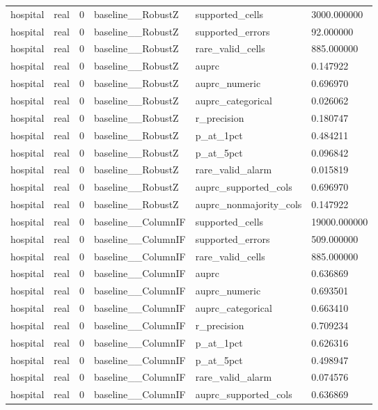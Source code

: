 \begin{tabular}{llllll}
hospital & real & 0 & baseline\_\_RobustZ & supported\_cells & 3000.000000 \\
hospital & real & 0 & baseline\_\_RobustZ & supported\_errors & 92.000000 \\
hospital & real & 0 & baseline\_\_RobustZ & rare\_valid\_cells & 885.000000 \\
hospital & real & 0 & baseline\_\_RobustZ & auprc & 0.147922 \\
hospital & real & 0 & baseline\_\_RobustZ & auprc\_numeric & 0.696970 \\
hospital & real & 0 & baseline\_\_RobustZ & auprc\_categorical & 0.026062 \\
hospital & real & 0 & baseline\_\_RobustZ & r\_precision & 0.180747 \\
hospital & real & 0 & baseline\_\_RobustZ & p\_at\_1pct & 0.484211 \\
hospital & real & 0 & baseline\_\_RobustZ & p\_at\_5pct & 0.096842 \\
hospital & real & 0 & baseline\_\_RobustZ & rare\_valid\_alarm & 0.015819 \\
hospital & real & 0 & baseline\_\_RobustZ & auprc\_supported\_cols & 0.696970 \\
hospital & real & 0 & baseline\_\_RobustZ & auprc\_nonmajority\_cols & 0.147922 \\
hospital & real & 0 & baseline\_\_ColumnIF & supported\_cells & 19000.000000 \\
hospital & real & 0 & baseline\_\_ColumnIF & supported\_errors & 509.000000 \\
hospital & real & 0 & baseline\_\_ColumnIF & rare\_valid\_cells & 885.000000 \\
hospital & real & 0 & baseline\_\_ColumnIF & auprc & 0.636869 \\
hospital & real & 0 & baseline\_\_ColumnIF & auprc\_numeric & 0.693501 \\
hospital & real & 0 & baseline\_\_ColumnIF & auprc\_categorical & 0.663410 \\
hospital & real & 0 & baseline\_\_ColumnIF & r\_precision & 0.709234 \\
hospital & real & 0 & baseline\_\_ColumnIF & p\_at\_1pct & 0.626316 \\
hospital & real & 0 & baseline\_\_ColumnIF & p\_at\_5pct & 0.498947 \\
hospital & real & 0 & baseline\_\_ColumnIF & rare\_valid\_alarm & 0.074576 \\
hospital & real & 0 & baseline\_\_ColumnIF & auprc\_supported\_cols & 0.636869 \\

\end{tabular}
